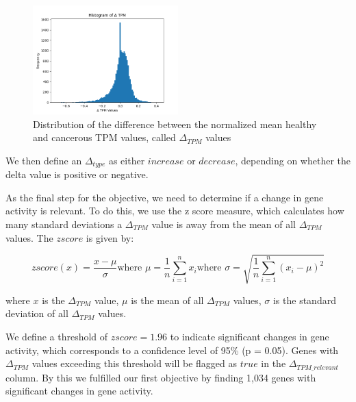 \begin{figure}[h]
    \centering
    \includegraphics[width=0.5\textwidth]{figures/03_02_delta_tpm}
    \caption{Distribution of the difference between the normalized mean healthy and cancerous TPM values, called $\Delta_{TPM}$ values}
    \label{fig:03_02_delta_tpm}
\end{figure}

We then define an $\Delta_{type}$ as either $increase$ or $decrease$, depending on whether the delta value is positive or negative.

As the final step for the objective, we need to determine if a change in gene activity is relevant.
To do this, we use the z score measure, which calculates how many standard deviations a $\Delta_{TPM}$ value is away
from the mean of all $\Delta_{TPM}$ values.
The $z score$ is given by:

\begin{subequations}
    \begin{equation} \label{eq:z_score}
        z score (x) = \frac{x - {\mu}}{\sigma}
    \end{equation}
    \begin{equation}
        \text{where } \mu = \frac{1}{n} \sum_{i=1}^{n} x_i
        \label{eq:mean}
    \end{equation}
    \begin{equation}
        \text{where } \sigma = \sqrt{\frac{1}{n} \sum_{i=1}^{n} (x_i - \mu)^2}
        \label{eq:std}
    \end{equation}
\end{subequations}

where $x$ is the $\Delta_{TPM}$ value, $\mu$ is the mean of all $\Delta_{TPM}$ values, $\sigma$ is the standard deviation of all $\Delta_{TPM}$ values.

We define a threshold of $z score = 1.96$ to indicate significant changes in gene activity,
which corresponds to a confidence level of 95\% (p = 0.05).
Genes with $\Delta_{TPM}$ values exceeding this threshold will be flagged as $true$ in the $\Delta_{TPM\_relevant}$ column.
By this we fulfilled our first objective by finding 1,034 genes with significant changes in gene activity.

